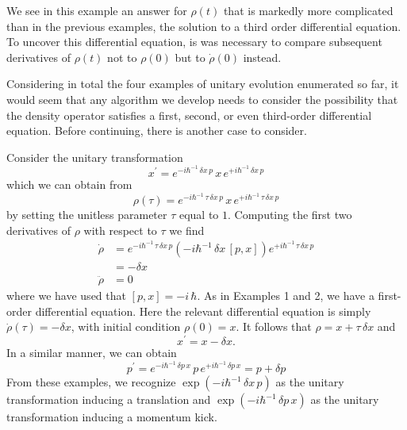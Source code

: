 We see in this example an answer for $\rho(t)$ that is markedly more complicated than in the previous examples, the solution to a third order differential equation.  To uncover this differential equation, is was necessary to compare subsequent derivatives of $\rho(t)$ not to $\rho(0)$ but to $\dot{\rho}(0)$ instead.

Considering in total the four examples of unitary evolution enumerated so far, it would seem that any algorithm we develop needs to consider the possibility that the density operator satisfies a first, second, or even third-order differential equation.  
Before continuing, there is another case to consider.

 Consider the unitary transformation
\begin{equation}
x^{\prime}  = 
  e^{-i \hbar^{-1} \, \delta x \, p}
  \, x \,
  e^{+i \hbar^{-1} \, \delta x \, p}
\end{equation}
which we can obtain from
\begin{equation}
\rho(\tau) = 
   e^{-i \hbar^{-1} \, \tau \, \delta x \, p}
     \, x \,
     e^{+i \hbar^{-1} \, \tau \, \delta x \, p}
\end{equation}
by setting the unitless parameter $\tau$ equal to $1$.
Computing the first two derivatives of $\rho$ with respect to $\tau$ we find
\begin{subequations}
\begin{align}
\dot{\rho} & =
  e^{-i \hbar^{-1} \, \tau \, \delta x \, p} 
  \left( -i \hbar^{-1} \, \delta x \, [p, x] \right) 
  e^{+i \hbar^{-1} \, \tau \, \delta x \, p} \\
  & = - \delta x \\
\ddot{\rho} & = 0 
\end{align}
\end{subequations}
where we have used that $[p, x] = -i \, \hbar$.
As in Examples 1 and 2, we have a first-order differential equation.
Here the relevant differential equation is simply $\dot{\rho}(\tau) = - \delta x$, with initial condition $\rho(0) = x$.
It follows that $\rho = x + \tau \, \delta{x}$ and
\begin{equation}
x^{\prime}  = x - \delta x.  \label{eq:translate-x}
\end{equation}
In a similar manner, we can obtain
\begin{equation}
p^{\prime}  = 
  e^{-i \hbar^{-1} \, \delta p \, x}
  \, p \,
  e^{+i \hbar^{-1} \, \delta p \, x}
  = p + \delta p
\end{equation}
From these examples, we recognize $\exp\!{\left( -i \hbar^{-1} \, \delta x \, p \right)}$ as the unitary transformation inducing a translation and $\exp\!{\left( -i \hbar^{-1} \, \delta p \, x \right)}$ as the unitary transformation inducing a momentum kick.

